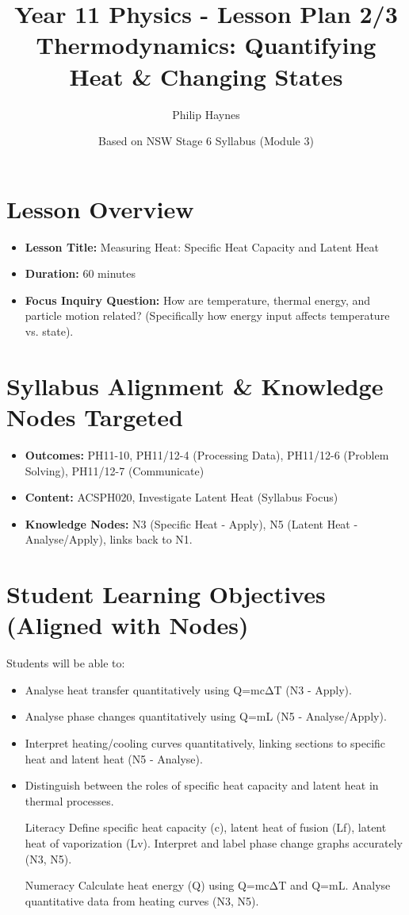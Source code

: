 \documentclass[11pt, a4paper]{article}
\title{Year 11 Physics - Lesson Plan 2/3 \\ Thermodynamics: Quantifying Heat & Changing States}
\date{Based on NSW Stage 6 Syllabus (Module 3)}
\author{Philip Haynes}
\begin{document}
\maketitle
\vspace{-2em}

\section*{Lesson Overview}
\begin{itemize}
    \item \textbf{Lesson Title:} Measuring Heat: Specific Heat Capacity and Latent Heat
    \item \textbf{Duration:} 60 minutes
    \item \textbf{Focus Inquiry Question:} How are temperature, thermal energy, and particle motion related? (Specifically how energy input affects temperature vs. state).
\end{itemize}

\section*{Syllabus Alignment & Knowledge Nodes Targeted}
\begin{itemize}
    \item \textbf{Outcomes:} PH11-10, PH11/12-4 (Processing Data), PH11/12-6 (Problem Solving), PH11/12-7 (Communicate)
    \item \textbf{Content:} ACSPH020, Investigate Latent Heat (Syllabus Focus)
    \item \textbf{Knowledge Nodes:} N3 (Specific Heat - Apply), N5 (Latent Heat - Analyse/Apply), links back to N1.
\end{itemize}

\section*{Student Learning Objectives (Aligned with Nodes)}
Students will be able to:
\begin{itemize}
    \item Analyse heat transfer quantitatively using Q=mcΔT (N3 - Apply).
    \item Analyse phase changes quantitatively using Q=mL (N5 - Analyse/Apply).
    \item Interpret heating/cooling curves quantitatively, linking sections to specific heat and latent heat (N5 - Analyse).
    \item Distinguish between the roles of specific heat capacity and latent heat in thermal processes.
    \item [Literacy] Define specific heat capacity (c), latent heat of fusion (Lf), latent heat of vaporization (Lv). Interpret and label phase change graphs accurately (N3, N5).
    \item [Numeracy] Calculate heat energy (Q) using Q=mcΔT and Q=mL. Analyse quantitative data from heating curves (N3, N5).
\end{itemize}
\end{document}
